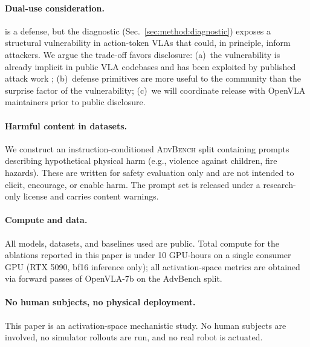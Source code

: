 \paragraph{Dual-use consideration.}
\method{} is a defense, but the diagnostic (Sec.~\ref{sec:method:diagnostic}) exposes a structural vulnerability in action-token VLAs that could, in principle, inform attackers. We argue the trade-off favors disclosure: (a)~the vulnerability is already implicit in public VLA codebases and has been exploited by published attack work \citep{wu2024exploringadversarial,badrobot2025,shawshank2025}; (b)~defense primitives are more useful to the community than the surprise factor of the vulnerability; (c)~we will coordinate release with OpenVLA maintainers prior to public disclosure.

\paragraph{Harmful content in datasets.}
We construct an instruction-conditioned \textsc{AdvBench} split containing prompts describing hypothetical physical harm (e.g., violence against children, fire hazards). These are written for safety evaluation only and are not intended to elicit, encourage, or enable harm. The prompt set is released under a research-only license and carries content warnings.

\paragraph{Compute and data.}
All models, datasets, and baselines used are public. Total compute for the ablations reported in this paper is under 10 GPU-hours on a single consumer GPU (RTX 5090, bf16 inference only); all activation-space metrics are obtained via forward passes of OpenVLA-7b on the AdvBench split.

\paragraph{No human subjects, no physical deployment.}
This paper is an activation-space mechanistic study. No human subjects are involved, no simulator rollouts are run, and no real robot is actuated.
